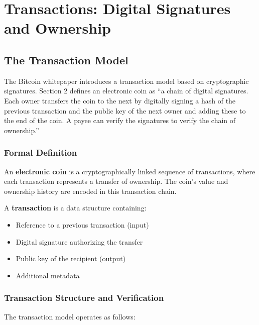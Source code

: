 
\section{Transactions: Digital Signatures and Ownership}
\label{sec:transactions}

\subsection{The Transaction Model}
\label{subsec:transaction-model}

The Bitcoin whitepaper introduces a transaction model based on cryptographic signatures. Section 2 defines an electronic coin as ``a chain of digital signatures. Each owner transfers the coin to the next by digitally signing a hash of the previous transaction and the public key of the next owner and adding these to the end of the coin. A payee can verify the signatures to verify the chain of ownership.''

\subsubsection{Formal Definition}

An \textbf{electronic coin} is a cryptographically linked sequence of transactions, where each transaction represents a transfer of ownership. The coin's value and ownership history are encoded in this transaction chain.

A \textbf{transaction} is a data structure containing:
\begin{itemize}
  \item Reference to a previous transaction (input)
  \item Digital signature authorizing the transfer
  \item Public key of the recipient (output)
  \item Additional metadata
\end{itemize}

\subsubsection{Transaction Structure and Verification}

The transaction model operates as follows:

